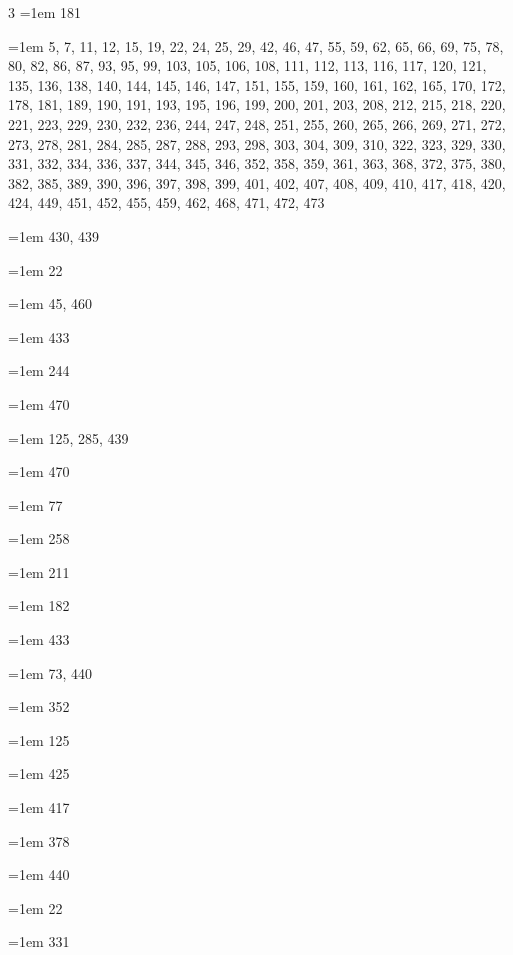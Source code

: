 \begin{multicols}{3}
\hangindent=1em  181\par
\hangindent=1em  5, 7, 11, 12, 15, 19, 22, 24, 25, 29, 42, 46, 47, 55, 59, 62, 65, 66, 69, 75, 78, 80, 82, 86, 87, 93, 95, 99, 103, 105, 106, 108, 111, 112, 113, 116, 117, 120, 121, 135, 136, 138, 140, 144, 145, 146, 147, 151, 155, 159, 160, 161, 162, 165, 170, 172, 178, 181, 189, 190, 191, 193, 195, 196, 199, 200, 201, 203, 208, 212, 215, 218, 220, 221, 223, 229, 230, 232, 236, 244, 247, 248, 251, 255, 260, 265, 266, 269, 271, 272, 273, 278, 281, 284, 285, 287, 288, 293, 298, 303, 304, 309, 310, 322, 323, 329, 330, 331, 332, 334, 336, 337, 344, 345, 346, 352, 358, 359, 361, 363, 368, 372, 375, 380, 382, 385, 389, 390, 396, 397, 398, 399, 401, 402, 407, 408, 409, 410, 417, 418, 420, 424, 449, 451, 452, 455, 459, 462, 468, 471, 472, 473\par
\hangindent=1em  430, 439\par
\hangindent=1em  22\par
\hangindent=1em  45, 460\par
\hangindent=1em  433\par
\hangindent=1em  244\par
\hangindent=1em  470\par
\hangindent=1em  125, 285, 439\par
\hangindent=1em  470\par
\hangindent=1em  77\par
\hangindent=1em  258\par
\hangindent=1em  211\par
\hangindent=1em  182\par
\hangindent=1em  433\par
\hangindent=1em  73, 440\par
\hangindent=1em  352\par
\hangindent=1em  125\par
\hangindent=1em  425\par
\hangindent=1em  417\par
\hangindent=1em  378\par
\hangindent=1em  440\par
\hangindent=1em  22\par
\hangindent=1em  331\par

\end{multicols}
